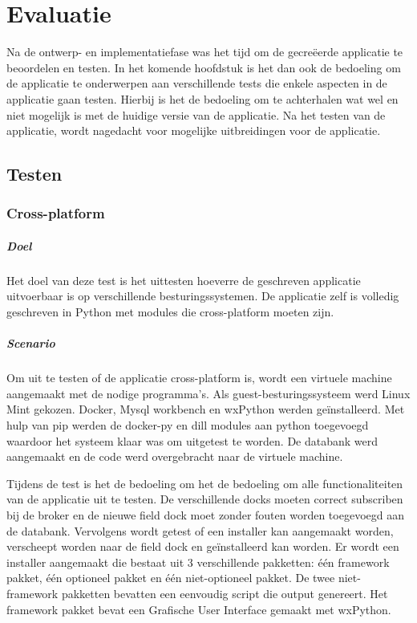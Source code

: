 \chapter{Evaluatie}
Na de ontwerp- en implementatiefase was het tijd om de gecreëerde applicatie te beoordelen en testen.
In het komende hoofdstuk is het dan ook de bedoeling om de applicatie te onderwerpen aan verschillende tests die enkele aspecten in de applicatie gaan testen.
Hierbij is het de bedoeling om te achterhalen wat wel en niet mogelijk is met de huidige versie van de applicatie.
Na het testen van de applicatie, wordt nagedacht voor mogelijke uitbreidingen voor de applicatie.

\section{Testen}
\subsection{Cross-platform}
\paragraph{Doel}
Het doel van deze test is het uittesten hoeverre de geschreven applicatie uitvoerbaar is op verschillende besturingssystemen.
De applicatie zelf is volledig geschreven in Python met modules die cross-platform moeten zijn.

\paragraph{Scenario}
Om uit te testen of de applicatie cross-platform is, wordt een virtuele machine aangemaakt met de nodige programma's.
Als guest-besturingssysteem werd Linux Mint gekozen. 
Docker, Mysql workbench en wxPython werden geïnstalleerd.
Met hulp van pip werden de docker-py en dill modules aan python toegevoegd waardoor het systeem klaar was om uitgetest te worden.
De databank werd aangemaakt en de code werd overgebracht naar de virtuele machine.

Tijdens de test is het de bedoeling om het de bedoeling om alle functionaliteiten van de applicatie uit te testen.
De verschillende docks moeten correct subscriben bij de broker en de nieuwe field dock moet zonder fouten worden toegevoegd aan de databank.
Vervolgens wordt getest of een installer kan aangemaakt worden, verscheept worden naar de field dock en geïnstalleerd kan worden.
Er wordt een installer aangemaakt die bestaat uit 3 verschillende pakketten: één framework pakket, één optioneel pakket en één niet-optioneel pakket.
De twee niet-framework pakketten bevatten een eenvoudig script die output genereert.
Het framework pakket bevat een Grafische User Interface gemaakt met wxPython.

